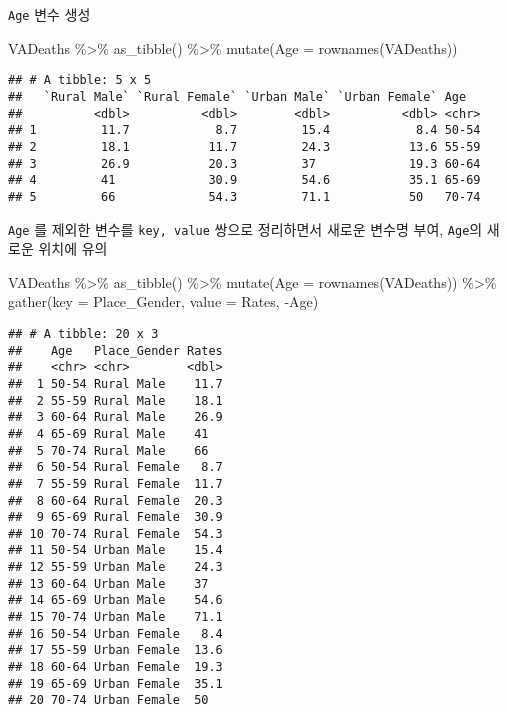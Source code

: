 \documentclass[
]{article}
\newenvironment{Shaded}{\begin{snugshade}}{\end{snugshade}}
\newcommand{\AttributeTok}[1]{\textcolor[rgb]{0.77,0.63,0.00}{#1}}
\newcommand{\FunctionTok}[1]{\textcolor[rgb]{0.00,0.00,0.00}{#1}}
\newcommand{\NormalTok}[1]{#1}
\newcommand{\SpecialCharTok}[1]{\textcolor[rgb]{0.00,0.00,0.00}{#1}}
\begin{document}
\texttt{Age} 변수 생성

\begin{Shaded}
\begin{Highlighting}[]
\NormalTok{VADeaths }\SpecialCharTok{\%\textgreater{}\%}
  \FunctionTok{as\_tibble}\NormalTok{() }\SpecialCharTok{\%\textgreater{}\%}
  \FunctionTok{mutate}\NormalTok{(}\AttributeTok{Age =} \FunctionTok{rownames}\NormalTok{(VADeaths))}
\end{Highlighting}
\end{Shaded}

\begin{verbatim}
## # A tibble: 5 x 5
##   `Rural Male` `Rural Female` `Urban Male` `Urban Female` Age  
##          <dbl>          <dbl>        <dbl>          <dbl> <chr>
## 1         11.7            8.7         15.4            8.4 50-54
## 2         18.1           11.7         24.3           13.6 55-59
## 3         26.9           20.3         37             19.3 60-64
## 4         41             30.9         54.6           35.1 65-69
## 5         66             54.3         71.1           50   70-74
\end{verbatim}

\texttt{Age} 를 제외한 변수를 \texttt{key,\ value} 쌍으로 정리하면서
새로운 변수명 부여, \texttt{Age}의 새로운 위치에 유의

\begin{Shaded}
\begin{Highlighting}[]
\NormalTok{VADeaths }\SpecialCharTok{\%\textgreater{}\%}
  \FunctionTok{as\_tibble}\NormalTok{() }\SpecialCharTok{\%\textgreater{}\%}
  \FunctionTok{mutate}\NormalTok{(}\AttributeTok{Age =} \FunctionTok{rownames}\NormalTok{(VADeaths)) }\SpecialCharTok{\%\textgreater{}\%}
  \FunctionTok{gather}\NormalTok{(}\AttributeTok{key =}\NormalTok{ Place\_Gender, }
         \AttributeTok{value =}\NormalTok{ Rates,}
         \SpecialCharTok{{-}}\NormalTok{Age)}
\end{Highlighting}
\end{Shaded}

\begin{verbatim}
## # A tibble: 20 x 3
##    Age   Place_Gender Rates
##    <chr> <chr>        <dbl>
##  1 50-54 Rural Male    11.7
##  2 55-59 Rural Male    18.1
##  3 60-64 Rural Male    26.9
##  4 65-69 Rural Male    41  
##  5 70-74 Rural Male    66  
##  6 50-54 Rural Female   8.7
##  7 55-59 Rural Female  11.7
##  8 60-64 Rural Female  20.3
##  9 65-69 Rural Female  30.9
## 10 70-74 Rural Female  54.3
## 11 50-54 Urban Male    15.4
## 12 55-59 Urban Male    24.3
## 13 60-64 Urban Male    37  
## 14 65-69 Urban Male    54.6
## 15 70-74 Urban Male    71.1
## 16 50-54 Urban Female   8.4
## 17 55-59 Urban Female  13.6
## 18 60-64 Urban Female  19.3
## 19 65-69 Urban Female  35.1
## 20 70-74 Urban Female  50
\end{verbatim}
\end{document}
